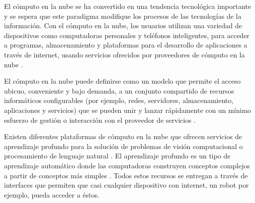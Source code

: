 

El cómputo en la nube se ha convertido en una
tendencia tecnológica importante y se espera que este paradigma modifique los procesos de las tecnologías de
la información. Con el cómputo en la nube, los usuarios 
 utilizan una variedad de dispositivos como 
 computadoras personales y teléfonos inteligentes,
 para acceder a programas, almacenamiento y plataformas
 para el desarrollo de aplicaciones a través de internet,
 usando servicios ofrecidos por proveedores de cómputo
 en la nube \cite{borkofurhtarmandoescalante2010}. 
 
 
El cómputo en la nube puede definirse como un modelo 
que permite el acceso ubicuo, conveniente y bajo demanda, 
a un conjunto compartido de recursos informáticos 
configurables (por ejemplo, redes, servidores, 
almacenamiento, aplicaciones y servicios) que se pueden 
unir y lanzar rápidamente con un mínimo esfuerzo de 
gestión o interacción con el proveedor de servicios \cite{mell_peter_tim_2011}.


Existen diferentes plataformas 
de cómputo en la nube que 
ofrecen servicios de aprendizaje profundo
para la solución de problemas de visión
computacional \cite{googlevision2018} o
procesamiento de lenguaje natural \cite{witaidocs2018}.
El aprendizaje profundo es un 
tipo de aprendizaje automático donde las computadoras 
construyen conceptos complejos a partir de conceptos más 
simples \cite{iangoodfellowyoshuabengioaaroncourville2017}.
Todos estos recursos se entregan a través de 
interfaces que
permiten que casi cualquier dispositivo con internet, un robot
por ejemplo, pueda acceder a éstos.



